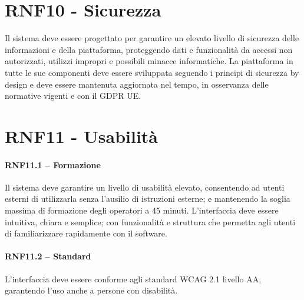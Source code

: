 \section{RNF10 - Sicurezza}
Il sistema deve essere progettato per garantire un elevato livello di sicurezza delle informazioni e della piattaforma, proteggendo dati e funzionalità da accessi non autorizzati, utilizzi impropri e possibili minacce informatiche. La piattaforma in tutte le sue componenti deve essere sviluppata seguendo i principi di sicurezza by design e deve essere mantenuta aggiornata nel tempo, in osservanza delle normative vigenti e con il GDPR UE.

\newpage

\section{RNF11 - Usabilità}
\paragraph{RNF11.1 – Formazione}
Il sistema deve garantire un livello di usabilità elevato, consentendo ad utenti esterni di utilizzarla senza l’ausilio di istruzioni esterne; e mantenendo la soglia massima di formazione degli operatori a 45 minuti. L’interfaccia deve essere intuitiva, chiara e semplice; con funzionalità e struttura che permetta agli utenti di familiarizzare rapidamente con il software.
\paragraph{RNF11.2 – Standard}
 L’interfaccia deve essere conforme agli standard WCAG 2.1 livello AA, garantendo l’uso anche a persone con disabilità.
